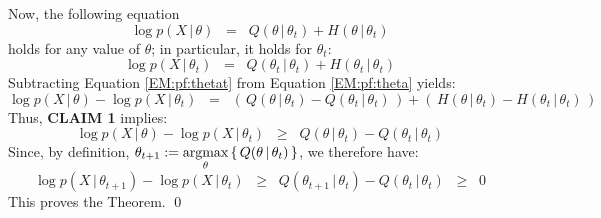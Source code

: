 Now, the following equation
\begin{equation}
\label{EM:pf:theta}
\log p(X\,|\,\theta)
\;\; = \;\;
Q(\theta\,|\,\theta_{t}) + H(\theta\,|\,\theta_{t})
\end{equation}
holds for any value of $\theta$; in particular, it holds for $\theta_{t}$:
\begin{equation}
\label{EM:pf:thetat}
\log p(X\,|\,\theta_{t})
\;\; = \;\;
Q(\theta_{t}\,|\,\theta_{t}) + H(\theta_{t}\,|\,\theta_{t})
\end{equation}
Subtracting Equation \eqref{EM:pf:thetat} from Equation \eqref{EM:pf:theta} yields:
\begin{equation}
\log p(X\,|\,\theta) - \log p(X\,|\,\theta_{t})
\;\; = \;\;
\left(\,Q(\theta\,|\,\theta_{t}) - Q(\theta_{t}\,|\,\theta_{t})\,\right)
+
\left(\,H(\theta\,|\,\theta_{t}) - H(\theta_{t}\,|\,\theta_{t})\,\right)
\end{equation}
Thus, \textbf{CLAIM 1} implies:
\begin{equation}
\log p(X\,|\,\theta) - \log p(X\,|\,\theta_{t})
\;\; \geq \;\;
Q(\theta\,|\,\theta_{t}) - Q(\theta_{t}\,|\,\theta_{t})
\end{equation}
Since, by definition, $\theta_{t+1} := \underset{\theta}{\textnormal{argmax}}\left\{\,Q(\theta\,|\,\theta_{t})\,\right\}$,
we therefore have:
\begin{equation}
\log p(X\,|\,\theta_{t+1}) - \log p(X\,|\,\theta_{t})
\;\; \geq \;\;
Q(\theta_{t+1}\,|\,\theta_{t}) - Q(\theta_{t}\,|\,\theta_{t})
\;\; \geq \;\;
0
\end{equation}
This proves the Theorem.  \qed


